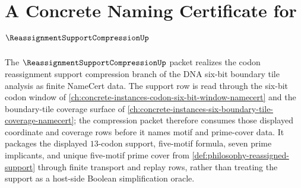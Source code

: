 \chapter{A Concrete Naming Certificate for $\ReassignmentSupportCompressionUp$}
\label{ch:concrete-instances-reassignment-support-compression-namecert}

The $\ReassignmentSupportCompressionUp$ packet realizes the codon reassignment support compression branch of the DNA six-bit boundary tile analysis as finite NameCert data. The support row is read through the six-bit codon window of \autoref{ch:concrete-instances-codon-six-bit-window-namecert} and the boundary-tile coverage surface of \autoref{ch:concrete-instances-six-boundary-tile-coverage-namecert}; the compression packet therefore consumes those displayed coordinate and coverage rows before it names motif and prime-cover data. It packages the displayed $13$-codon support, five-motif formula, seven prime implicants, and unique five-motif prime cover from \autoref{def:philosophy-reassigned-support} through finite transport and replay rows, rather than treating the support as a host-side Boolean simplification oracle.



